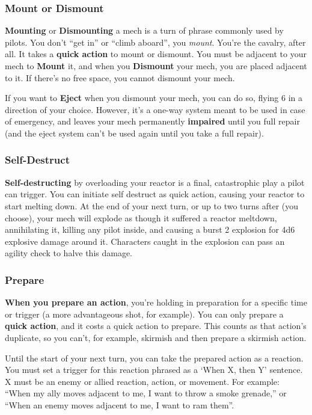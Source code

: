 \subsubsection{Mount or Dismount}
\textbf{Mounting} or \textbf{Dismounting} a mech is a turn of phrase commonly used by pilots. You don't ``get in'' or ``climb aboard'', you \textit{mount}. You're the cavalry, after all. It takes a \textbf{quick action} to mount or dismount. You must be adjacent to your mech to \textbf{Mount} it, and when you \textbf{Dismount} your mech, you are placed adjacent to it. If there’s no free space, you cannot dismount your mech.

If you want to \textbf{Eject} when you dismount your mech, you can do so, flying 6 in a direction of your choice. However, it’s a one-way system meant to be used in case of emergency, and leaves your mech permanently \textbf{impaired} until you full repair (and the eject system can’t be used again until you take a full repair).


\subsubsection{Self-Destruct}
\textbf{Self-destructing} by overloading your reactor is a final, catastrophic play a pilot can trigger. You can initiate self destruct as quick action, causing your reactor to start melting down. At the end of your next turn, or up to two turns after (you choose), your mech will explode as though it suffered a reactor meltdown, annihilating it, killing any pilot inside, and causing a burst 2 explosion for 4d6 explosive damage around it. Characters caught in the explosion can pass an agility check to halve this damage.

\subsubsection{Prepare}
\textbf{When you prepare an action}, you’re holding in preparation for a specific time or trigger (a more advantageous shot, for example). You can only prepare a \textbf{quick action}, and it costs a quick action to prepare. This counts as that action’s duplicate, so you can’t, for example, skirmish and then prepare a skirmish action.

Until the start of your next turn, you can take the prepared action as a reaction. You must set a trigger for this reaction phrased as a `When X, then Y' sentence. X must be an enemy or allied reaction, action, or movement. For example: ``When my ally moves adjacent to me, I want to throw a smoke grenade,'' or ``When an enemy moves adjacent to me, I want to ram them''.

